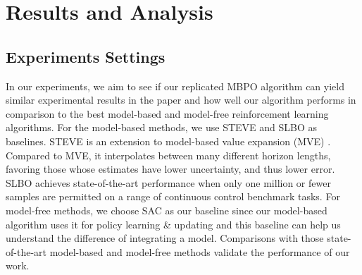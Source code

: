 \section{Results and Analysis}
\begin{table}[h]
  \caption{Hyperparameter Settings}
\end{table}
\subsection{Experiments Settings}

In our experiments, we aim to see if our replicated MBPO algorithm can yield similar experimental results in the paper and how well our algorithm performs in comparison to the best model-based and model-free reinforcement learning algorithms. For the model-based methods, we use STEVE and SLBO as baselines. STEVE is an extension to model-based value expansion (MVE) \cite{feinberg2018model}. Compared to MVE, it interpolates between many different horizon lengths, favoring those whose estimates have lower uncertainty, and thus lower error. SLBO achieves state-of-the-art performance when only one million or fewer samples are permitted on a range of continuous control benchmark tasks. For model-free methods, we choose SAC as our baseline since our model-based algorithm uses it for policy learning \& updating and this baseline can help us understand the difference of integrating a model. Comparisons with those state-of-the-art model-based and model-free methods validate the performance of our work.

